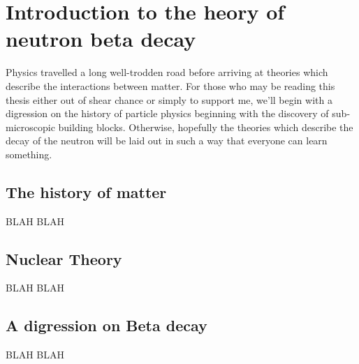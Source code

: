 \chapter{Introduction to the heory of neutron beta decay}
\label{ch:Introduction}

Physics travelled a long well-trodden road before arriving at theories which
describe the interactions between matter. For those who may be reading this thesis
either out of shear chance or simply to support me, we'll begin with a digression
on the history of particle physics beginning with the discovery of sub-microscopic
building blocks. Otherwise, hopefully the theories which describe the decay of the
neutron will be laid out in such a way that everyone can learn something. 


\section{The history of matter}
\label{sec:history_of_matter}

BLAH BLAH

\section{Nuclear Theory}
\label{sec:Ints}
BLAH BLAH


\section{A digression on Beta decay}
\label{sec:Ints}
BLAH BLAH



